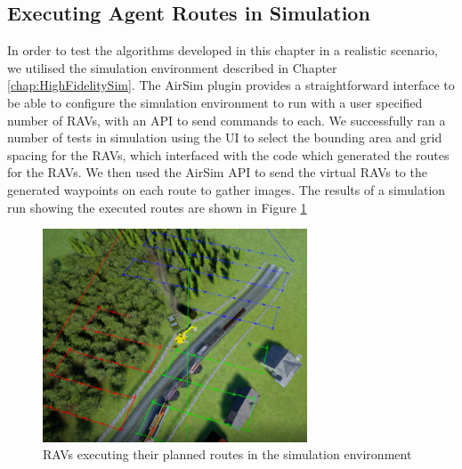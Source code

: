 \subsection{Executing Agent Routes in Simulation}\label{subsec:routesInSimulation}
In order to test the algorithms developed in this chapter in a realistic scenario, we utilised the simulation environment described in Chapter \ref{chap:HighFidelitySim}. The AirSim plugin \cite{Shah2017AirSim:Vehicles} provides a straightforward interface to be able to configure the simulation environment to run with a user specified number of RAVs, with an API to send commands to each. We successfully ran a number of tests in simulation using the UI to select the bounding area and grid spacing for the RAVs, which interfaced with the code which generated the routes for the RAVs. We then used the AirSim API to send the virtual RAVs to the generated waypoints on each route to gather images. The results of a simulation run showing the executed routes are shown in Figure \ref{fig:VirtualPlannedRoutes}


\begin{figure}[h]
    \centering
    \includegraphics[width=0.7\textwidth]{Chapters/SimulationEnv/Figs/DebuggingLines/RoutesWithRAVsVisible.png}
    \caption{RAVs executing their planned routes in the simulation environment}
    \label{fig:VirtualPlannedRoutes}
\end{figure}